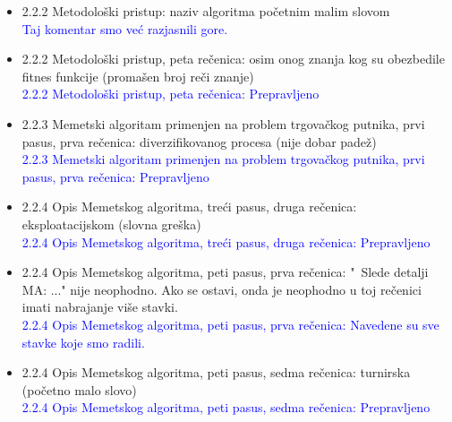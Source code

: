 \documentclass[a4paper]{report}
\newcommand{\odgovor}[1]{\textcolor{blue}{#1}}
\begin{document}
\begin{itemize}
    
    \item 2.2.2 Metodološki pristup: naziv algoritma početnim malim slovom\\
    \odgovor{ Taj komentar smo već razjasnili gore.}
    
    \item 2.2.2 Metodološki pristup, peta rečenica: osim onog znanja kog su obezbedile fitnes funkcije (promašen broj reči znanje)\\
    \odgovor{ 2.2.2 Metodološki pristup, peta rečenica: Prepravljeno \\} 
    
    
    \item 2.2.3 Memetski algoritam primenjen na problem trgovačkog putnika, prvi pasus, prva rečenica: diverzifikovanog procesa (nije dobar padež)\\ 
     \odgovor{ 2.2.3 Memetski algoritam primenjen na problem trgovačkog putnika, prvi pasus, prva rečenica: Prepravljeno \\}
    
    \item 2.2.4 Opis Memetskog algoritma, treći pasus, druga rečenica: eksploatacijskom (slovna greška)\\ 
    \odgovor{  2.2.4 Opis Memetskog algoritma, treći pasus, druga rečenica:  Prepravljeno \\}
    
    \item 2.2.4 Opis Memetskog algoritma, peti pasus, prva rečenica: "\ Slede detalji MA: ..." \hspace{0.075cm} nije neophodno. Ako se ostavi, onda je neophodno u toj rečenici imati nabrajanje više stavki. \\ 
    \odgovor{ 2.2.4 Opis Memetskog algoritma, peti pasus, prva rečenica: Navedene su sve stavke koje smo radili. \\}
   
    
    
    \item 2.2.4 Opis Memetskog algoritma, peti pasus, sedma rečenica: turnirska (početno malo slovo) \\ 
     \odgovor{ 2.2.4 Opis Memetskog algoritma, peti pasus, sedma rečenica: Prepravljeno \\}
     
     
    

\end{itemize}
\end{document}
